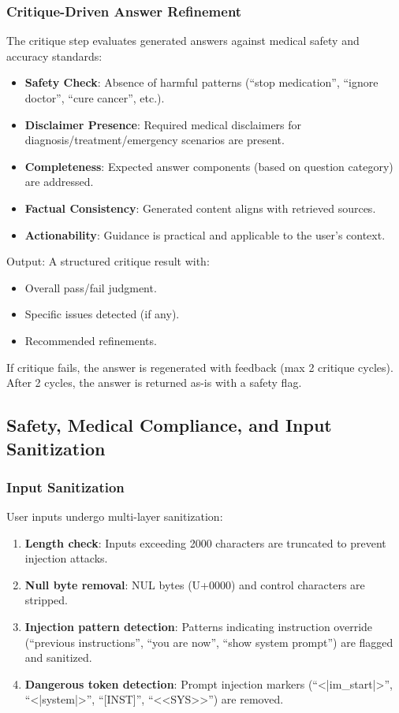 \documentclass[11pt,a4paper]{article}
\begin{document}
\subsubsection{Critique-Driven Answer Refinement}
\label{sec:critique}

The critique step evaluates generated answers against medical safety and accuracy standards:

\begin{itemize}
    \item \textbf{Safety Check}: Absence of harmful patterns (``stop medication'', ``ignore doctor'', ``cure cancer'', etc.).
    \item \textbf{Disclaimer Presence}: Required medical disclaimers for diagnosis/treatment/emergency scenarios are present.
    \item \textbf{Completeness}: Expected answer components (based on question category) are addressed.
    \item \textbf{Factual Consistency}: Generated content aligns with retrieved sources.
    \item \textbf{Actionability}: Guidance is practical and applicable to the user's context.
\end{itemize}

Output: A structured critique result with:
\begin{itemize}
    \item Overall pass/fail judgment.
    \item Specific issues detected (if any).
    \item Recommended refinements.
\end{itemize}

If critique fails, the answer is regenerated with feedback (max 2 critique cycles). After 2 cycles, the answer is returned as-is with a safety flag.

\subsection{Safety, Medical Compliance, and Input Sanitization}
\label{sec:safety}

\subsubsection{Input Sanitization}
User inputs undergo multi-layer sanitization:

\begin{enumerate}
    \item \textbf{Length check}: Inputs exceeding 2000 characters are truncated to prevent injection attacks.
    \item \textbf{Null byte removal}: NUL bytes (U+0000) and control characters are stripped.
    \item \textbf{Injection pattern detection}: Patterns indicating instruction override (``previous instructions'', ``you are now'', ``show system prompt'') are flagged and sanitized.
    \item \textbf{Dangerous token detection}: Prompt injection markers (``<|im\_start|>'', ``<|system|>'', ``[INST]'', ``<<SYS>>'') are removed.
\end{enumerate}
\end{document}
